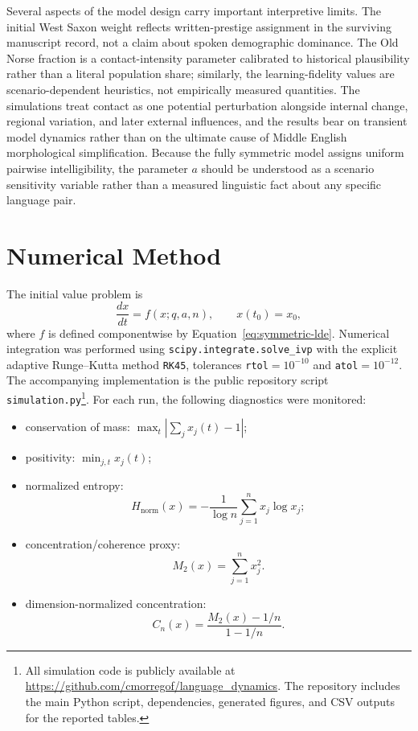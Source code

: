 \documentclass[11pt]{article}
\begin{document}
Several aspects of the model design carry important interpretive limits. The initial West Saxon weight reflects written-prestige assignment in the surviving manuscript record, not a claim about spoken demographic dominance. The Old Norse fraction is a contact-intensity parameter calibrated to historical plausibility rather than a literal population share; similarly, the learning-fidelity values are scenario-dependent heuristics, not empirically measured quantities. The simulations treat contact as one potential perturbation alongside internal change, regional variation, and later external influences, and the results bear on transient model dynamics rather than on the ultimate cause of Middle English morphological simplification. Because the fully symmetric model assigns uniform pairwise intelligibility, the parameter $a$ should be understood as a scenario sensitivity variable rather than a measured linguistic fact about any specific language pair.

\section{Numerical Method}

The initial value problem is
\begin{equation}
\frac{d x}{dt}=f(x;q,a,n),\qquad x(t_0)=x_0,
\end{equation}
where $f$ is defined componentwise by Equation~\eqref{eq:symmetric-lde}. Numerical integration was performed using \texttt{scipy.integrate.solve\_ivp} with the explicit adaptive Runge--Kutta method \texttt{RK45}, tolerances \texttt{rtol}$=10^{-10}$ and \texttt{atol}$=10^{-12}$. The accompanying implementation is the public repository script \texttt{simulation.py}\footnote{All simulation code is publicly available at \url{https://github.com/cmorregof/language_dynamics}. The repository includes the main Python script, dependencies, generated figures, and CSV outputs for the reported tables.}. For each run, the following diagnostics were monitored:
\begin{itemize}[noitemsep]
    \item conservation of mass: $\max_t |\sum_j x_j(t)-1|$;
    \item positivity: $\min_{j,t} x_j(t)$;
    \item normalized entropy:
    \begin{equation}
        H_{\mathrm{norm}}(x)=-\frac{1}{\log n}\sum_{j=1}^n x_j\log x_j;
    \end{equation}
    \item concentration/coherence proxy:
    \begin{equation}
        M_2(x)=\sum_{j=1}^n x_j^2.
    \end{equation}
    \item dimension-normalized concentration:
    \begin{equation}
        C_n(x)=\frac{M_2(x)-1/n}{1-1/n}.
        \label{eq:normalized-concentration}
    \end{equation}
\end{itemize}
\end{document}
